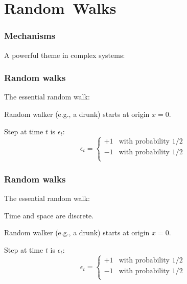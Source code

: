 \section{Random\ Walks}

\begin{frame}
  \frametitle{Mechanisms}

  A powerful theme in complex systems: \\


\end{frame}

\begin{frame}
  \frametitle{Random walks}

  The essential random walk:

  \inv


  Random walker (e.g., a drunk) starts at origin $x=0$.

  Step at time $t$ is $\epsilon_t$:
  $$
  \epsilon_t = 
  \left\{
    \begin{array}{ll}
      +1 & \mbox{with probability 1/2} \\
      -1 & \mbox{with probability 1/2} \\
    \end{array}
  \right.
  $$

\end{frame}

\begin{frame}
  \frametitle{Random walks}

  The essential random walk:


  \inv

   Time and space are discrete.

  Random walker (e.g., a drunk) starts at origin $x=0$.

  Step at time $t$ is $\epsilon_t$:
  $$
  \epsilon_t = 
  \left\{
    \begin{array}{ll}
      +1 & \mbox{with probability 1/2} \\
      -1 & \mbox{with probability 1/2} \\
    \end{array}
  \right.
  $$

\end{frame}

